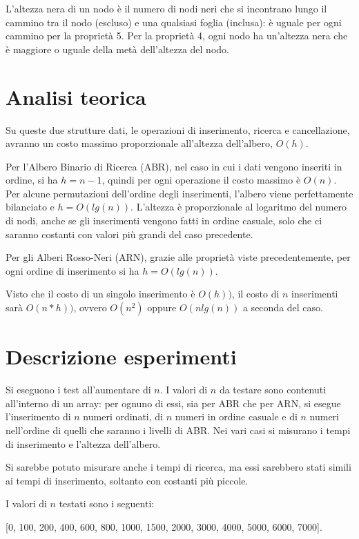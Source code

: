 \documentclass[]{article}
\begin{document}
L'altezza nera di un nodo è il numero di nodi neri che si incontrano lungo il cammino tra il nodo (escluso) e una qualsiasi foglia (inclusa): è uguale per ogni cammino per la proprietà 5.
Per la proprietà 4, ogni nodo ha un'altezza nera che è maggiore o uguale della metà dell'altezza del nodo.

\section{Analisi teorica}
Su queste due strutture dati, le operazioni di inserimento, ricerca e cancellazione, avranno un costo massimo proporzionale all'altezza dell'albero, $O(h)$.

Per l'Albero Binario di Ricerca (ABR), nel caso in cui i dati vengono inseriti in ordine, si ha $h = n-1$, quindi per ogni operazione il costo massimo è $O(n)$. 
Per alcune permutazioni dell'ordine degli inserimenti, l'albero viene perfettamente bilanciato e $h = O(lg(n))$. L'altezza è proporzionale al logaritmo del numero di nodi, anche se gli inserimenti vengono fatti in ordine casuale, solo che ci saranno costanti con valori più grandi del caso precedente.

Per gli Alberi Rosso-Neri (ARN), grazie alle proprietà viste precedentemente, per ogni ordine di inserimento si ha $h = O(lg(n))$.

Visto che il costo di un singolo inserimento è $O(h))$, il costo di $n$ inserimenti sarà $O(n*h))$, ovvero $O(n^2)$ oppure $O(n lg(n))$ a seconda del caso.

\section{Descrizione esperimenti}
Si eseguono i test all'aumentare di $n$. I valori di $n$ da testare sono contenuti all'interno di un array: per ognuno di essi, sia per ABR che per ARN, si esegue l'inserimento di $n$ numeri ordinati, di $n$ numeri in ordine casuale e di $n$ numeri nell'ordine di quelli che saranno i livelli di ABR. Nei vari casi si misurano i tempi di inserimento e l'altezza dell'albero.

Si sarebbe potuto misurare anche i tempi di ricerca, ma essi sarebbero stati simili ai tempi di inserimento, soltanto con costanti più piccole.

I valori di $n$ testati sono i seguenti:

[0, 100, 200, 400, 600, 800, 1000, 1500, 2000, 3000, 4000, 5000, 6000, 7000].
\end{document}

